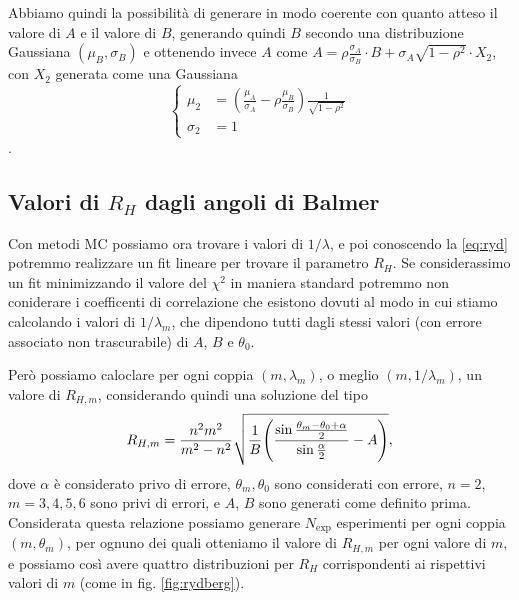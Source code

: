 \documentclass[a4paper,aps,12pt,tightenlines]{revtex4-2}
\begin{document}
Abbiamo quindi la possibilità di generare in modo coerente con quanto atteso il valore di $A$ e il valore di $B$, generando quindi $B$ secondo una distribuzione Gaussiana $(\mu_B, \sigma_B)$ e ottenendo invece $A$ come $A=\rho \frac{\sigma_A}{\sigma_B}\cdot B + \sigma_A \sqrt{1-\rho^2} \cdot X_2$, con $X_2$ generata come una Gaussiana \begin{equation}\left\{\begin{aligned}\mu_2 &= \left(\frac{\mu_A}{\sigma_A} - \rho\frac{\mu_B}{\sigma_B}\right)\frac{1}{\sqrt{1-\rho^2}}\\\sigma_2 &= 1\end{aligned}\right.\end{equation}.

\subsection{Valori di $R_H$ dagli angoli di Balmer}

Con metodi MC possiamo ora trovare i valori di $1/\lambda$, e poi conoscendo la \eqref{eq:ryd} potremmo realizzare un fit lineare per trovare il parametro $R_H$. Se considerassimo un fit minimizzando il valore del $\chi^2$ in maniera standard potremmo non coniderare i coefficenti di correlazione che esistono dovuti al modo in cui stiamo calcolando i valori di $1/\lambda_m$, che dipendono tutti dagli stessi valori (con errore associato non trascurabile) di $A$, $B$ e $\theta_0$. 

Però possiamo caloclare per ogni coppia $(m, \lambda_m)$, o meglio $(m, 1/\lambda_m)$, un valore di $R_{H,m}$, considerando quindi una soluzione del tipo \begin{equation} 
    R_{H,m} = \frac{n^2m^2}{m^2-n^2}\sqrt{\frac{1}{B} \qty(\frac{\sin\frac{\theta_m-\theta_0 + \alpha}{2}}{\sin\frac{\alpha}{2}}-A)},
\end{equation} dove $\alpha$ è considerato privo di errore, $\theta_m, \theta_0$ sono considerati con errore, $n=2$, $m=3,4,5,6$ sono privi di errori, e $A$, $B$ sono generati come definito prima. Considerata questa relazione possiamo generare $N_\text{exp}$ esperimenti per ogni coppia $(m, \theta_m)$, per ognuno dei quali otteniamo il valore di $R_{H,m}$ per ogni valore di $m$, e possiamo così avere quattro distribuzioni per $R_H$ corrispondenti ai rispettivi valori di $m$ (come in fig. \ref{fig:rydberg}). 
\end{document}

